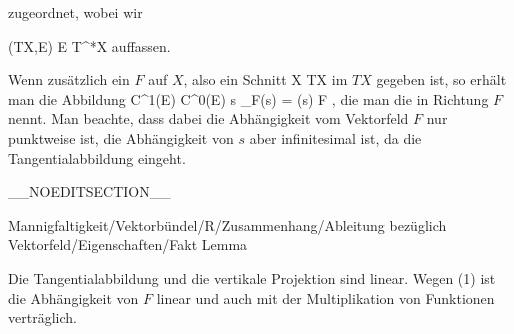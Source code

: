 zugeordnet, wobei wir

\mavergleichskette
{\vergleichskette
{ (TX,E)
}
{ \cong }{ E \otimes T^*X
}
{  }{
}
{    }{
}
{   }{
}
}
{}{}{}
auffassen.

Wenn zusätzlich ein
$F$ auf $X$, also ein Schnitt
 { X } { TX
} {}
im
$TX$ gegeben ist, so erhält man die Abbildung
 {C^1(E)} {C^0(E)
} {s } {\nabla_F(s) = \nabla (s) \circ F
} {,}
die man die  {} in Richtung $F$ nennt. Man beachte, dass dabei die Abhängigkeit vom Vektorfeld $F$ nur punktweise ist, die Abhängigkeit von $s$ aber infinitesimal ist, da die Tangentialabbildung
 eingeht.

__NOEDITSECTION__

{Mannigfaltigkeit/Vektorbündel/R/Zusammenhang/Ableitung bezüglich Vektorfeld/Eigenschaften/Fakt}
{Lemma}
{}
{

\faktzusatz {}
\faktzusatz {}

}
{

 {Die Tangentialabbildung und die vertikale Projektion sind linear. Wegen (1) ist die Abhängigkeit von $F$ linear und auch mit der Multiplikation von Funktionen verträglich.
}

}

